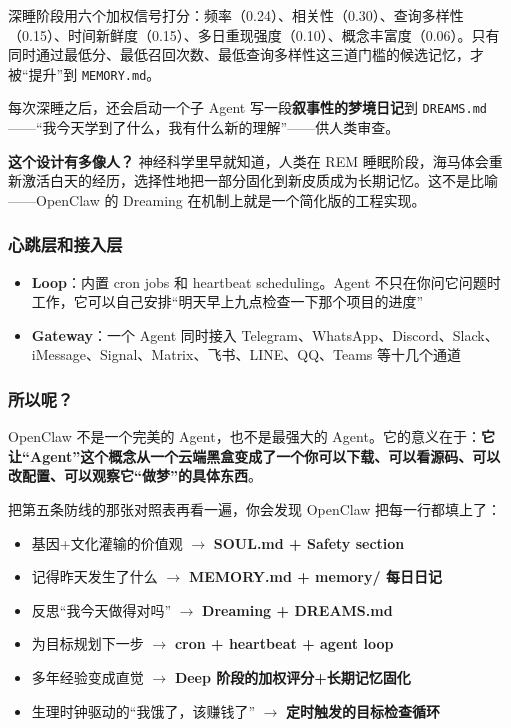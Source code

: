 \documentclass[11pt,a4paper]{ctexart}
\begin{document}
深睡阶段用六个加权信号打分：频率（0.24）、相关性（0.30）、查询多样性（0.15）、时间新鲜度（0.15）、多日重现强度（0.10）、概念丰富度（0.06）。只有同时通过最低分、最低召回次数、最低查询多样性这三道门槛的候选记忆，才被“提升”到 \texttt{MEMORY.md}。

每次深睡之后，还会启动一个子 Agent 写一段\textbf{叙事性的梦境日记}到 \texttt{DREAMS.md}——“我今天学到了什么，我有什么新的理解”——供人类审查。

\textbf{这个设计有多像人？} 神经科学里早就知道，人类在 REM 睡眠阶段，海马体会重新激活白天的经历，选择性地把一部分固化到新皮质成为长期记忆。这不是比喻——OpenClaw 的 Dreaming 在机制上就是一个简化版的工程实现。

\subsubsection{心跳层和接入层}

\begin{itemize}
  \item \textbf{Loop}：内置 cron jobs 和 heartbeat scheduling。Agent 不只在你问它问题时工作，它可以自己安排“明天早上九点检查一下那个项目的进度”
  \item \textbf{Gateway}：一个 Agent 同时接入 Telegram、WhatsApp、Discord、Slack、iMessage、Signal、Matrix、飞书、LINE、QQ、Teams 等十几个通道
\end{itemize}

\subsubsection{所以呢？}

OpenClaw 不是一个完美的 Agent，也不是最强大的 Agent。它的意义在于：\textbf{它让“Agent”这个概念从一个云端黑盒变成了一个你可以下载、可以看源码、可以改配置、可以观察它“做梦”的具体东西}。

把第五条防线的那张对照表再看一遍，你会发现 OpenClaw 把每一行都填上了：

\begin{itemize}
  \item 基因+文化灌输的价值观 $\to$ \textbf{SOUL.md + Safety section}
  \item 记得昨天发生了什么 $\to$ \textbf{MEMORY.md + memory/ 每日日记}
  \item 反思“我今天做得对吗” $\to$ \textbf{Dreaming + DREAMS.md}
  \item 为目标规划下一步 $\to$ \textbf{cron + heartbeat + agent loop}
  \item 多年经验变成直觉 $\to$ \textbf{Deep 阶段的加权评分+长期记忆固化}
  \item 生理时钟驱动的“我饿了，该赚钱了” $\to$ \textbf{定时触发的目标检查循环}
\end{itemize}
\end{document}
